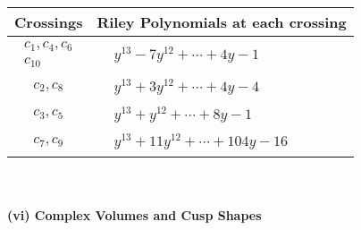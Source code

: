\documentclass[1p]{elsarticle_modified}
\theoremstyle{definition}
\begin{document}
\begin{tabular}{m{50pt}|m{274pt}}
Crossings & \hspace{64pt}Riley Polynomials at each crossing \\
\hline $$\begin{aligned}c_{1},c_{4},c_{6}\\c_{10}\end{aligned}$$&$\begin{aligned}
&y^{13}-7 y^{12}+\cdots+4 y-1
\end{aligned}$\\
\hline $$\begin{aligned}c_{2},c_{8}\end{aligned}$$&$\begin{aligned}
&y^{13}+3 y^{12}+\cdots+4 y-4
\end{aligned}$\\
\hline $$\begin{aligned}c_{3},c_{5}\end{aligned}$$&$\begin{aligned}
&y^{13}+y^{12}+\cdots+8 y-1
\end{aligned}$\\
\hline $$\begin{aligned}c_{7},c_{9}\end{aligned}$$&$\begin{aligned}
&y^{13}+11 y^{12}+\cdots+104 y-16
\end{aligned}$\\
\hline
\end{tabular}\\~\\
\newpage\flushleft \textbf{(vi) Complex Volumes and Cusp Shapes}
\end{document}
